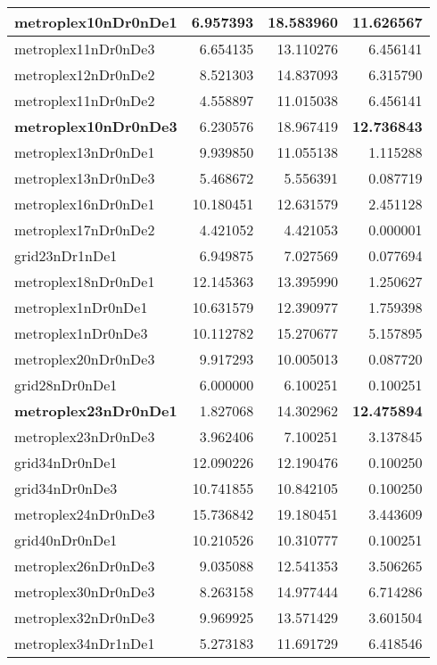 \documentclass[../../../thesis.tex]{subfiles}
\begin{document}
\begin{longtable}{|l|r|r|r|}
\endfoot
\endlastfoot
\textbf{metroplex10nDr0nDe1} & 6.957393 & 18.583960 & \textbf{11.626567} \\\hline
metroplex11nDr0nDe3 & 6.654135 & 13.110276 & 6.456141 \\\hline
metroplex12nDr0nDe2 & 8.521303 & 14.837093 & 6.315790 \\\hline
metroplex11nDr0nDe2 & 4.558897 & 11.015038 & 6.456141 \\\hline
\textbf{metroplex10nDr0nDe3} & 6.230576 & 18.967419 & \textbf{12.736843} \\\hline
metroplex13nDr0nDe1 & 9.939850 & 11.055138 & 1.115288 \\\hline
metroplex13nDr0nDe3 & 5.468672 & 5.556391 & 0.087719 \\\hline
metroplex16nDr0nDe1 & 10.180451 & 12.631579 & 2.451128 \\\hline
metroplex17nDr0nDe2 & 4.421052 & 4.421053 & 0.000001 \\\hline
grid23nDr1nDe1 & 6.949875 & 7.027569 & 0.077694 \\\hline
metroplex18nDr0nDe1 & 12.145363 & 13.395990 & 1.250627 \\\hline
metroplex1nDr0nDe1 & 10.631579 & 12.390977 & 1.759398 \\\hline
metroplex1nDr0nDe3 & 10.112782 & 15.270677 & 5.157895 \\\hline
metroplex20nDr0nDe3 & 9.917293 & 10.005013 & 0.087720 \\\hline
grid28nDr0nDe1 & 6.000000 & 6.100251 & 0.100251 \\\hline
\textbf{metroplex23nDr0nDe1} & 1.827068 & 14.302962 & \textbf{12.475894} \\\hline
metroplex23nDr0nDe3 & 3.962406 & 7.100251 & 3.137845 \\\hline
grid34nDr0nDe1 & 12.090226 & 12.190476 & 0.100250 \\\hline
grid34nDr0nDe3 & 10.741855 & 10.842105 & 0.100250 \\\hline
metroplex24nDr0nDe3 & 15.736842 & 19.180451 & 3.443609 \\\hline
grid40nDr0nDe1 & 10.210526 & 10.310777 & 0.100251 \\\hline
metroplex26nDr0nDe3 & 9.035088 & 12.541353 & 3.506265 \\\hline
metroplex30nDr0nDe3 & 8.263158 & 14.977444 & 6.714286 \\\hline
metroplex32nDr0nDe3 & 9.969925 & 13.571429 & 3.601504 \\\hline
metroplex34nDr1nDe1 & 5.273183 & 11.691729 & 6.418546 \\\hline

\end{longtable}
\end{document}
